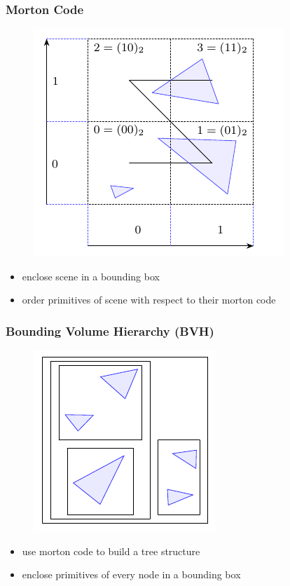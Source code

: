 \documentclass[aspectratio=169]{beamer}
\begin{document}
  \begin{frame}
    \frametitle{Morton Code}
    \begin{figure}[H]
      \center
      \includegraphics{morton_code_1_.pdf}
    \end{figure}
    \begin{itemize}
      \item enclose scene in a bounding box
      \item order primitives of scene with respect to their morton code
    \end{itemize}
  \end{frame}
  \begin{frame}
    \frametitle{Bounding Volume Hierarchy (BVH)}
    \begin{figure}[H]
      \center
      \includegraphics{bvh_1.pdf}
    \end{figure}
    \begin{itemize}
      \item use morton code to build a tree structure
      \item enclose primitives of every node in a bounding box
    \end{itemize}
  \end{frame}
\end{document}

